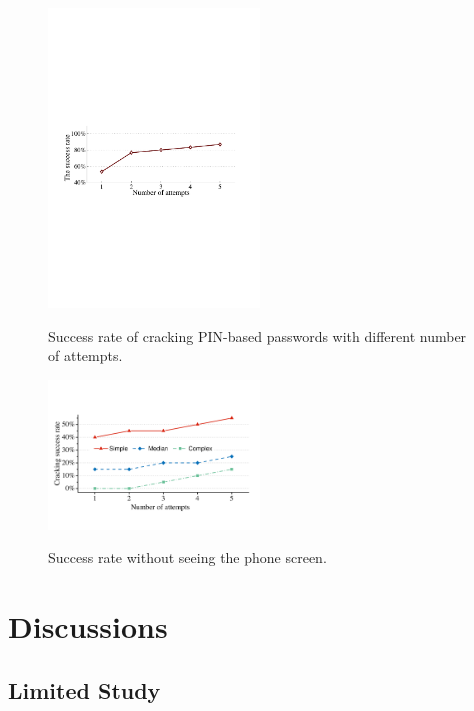     \begin{figure}[!t]
        \centering
        \includegraphics[width=0.5\textwidth]{fig/pin_results}\\
        \caption{Success rate of cracking PIN-based passwords with different number of attempts.}
        \label{fig:pin_results}
    \end{figure}
    
    \begin{figure}[!t]
        \centering
        \includegraphics[width=0.5\textwidth]{fig/finger-only}\\
        \caption{Success rate without seeing the phone screen.}
        \label{fig:finger-only}
    \end{figure}

\section{Discussions}

\subsection{Limited Study}


